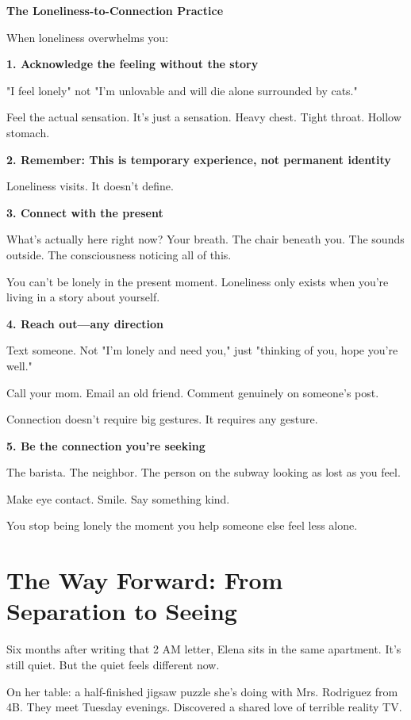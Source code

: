\documentclass[11pt,twoside]{book}
\begin{document}
\begin{practicebox}
\textbf{The Loneliness-to-Connection Practice}

When loneliness overwhelms you:

\textbf{1. Acknowledge the feeling without the story}

"I feel lonely" not "I'm unlovable and will die alone surrounded by cats."

Feel the actual sensation. It's just a sensation. Heavy chest. Tight throat. Hollow stomach.

\textbf{2. Remember: This is temporary experience, not permanent identity}

Loneliness visits. It doesn't define.

\textbf{3. Connect with the present}

What's actually here right now? Your breath. The chair beneath you. The sounds outside. The consciousness noticing all of this.

You can't be lonely in the present moment. Loneliness only exists when you're living in a story about yourself.

\textbf{4. Reach out—any direction}

Text someone. Not "I'm lonely and need you," just "thinking of you, hope you're well."

Call your mom. Email an old friend. Comment genuinely on someone's post.

Connection doesn't require big gestures. It requires any gesture.

\textbf{5. Be the connection you're seeking}

The barista. The neighbor. The person on the subway looking as lost as you feel.

Make eye contact. Smile. Say something kind.

You stop being lonely the moment you help someone else feel less alone.
\end{practicebox}

\section*{The Way Forward: From Separation to Seeing}

Six months after writing that 2 AM letter, Elena sits in the same apartment. It's still quiet. But the quiet feels different now.

On her table: a half-finished jigsaw puzzle she's doing with Mrs. Rodriguez from 4B. They meet Tuesday evenings. Discovered a shared love of terrible reality TV.
\end{document}
